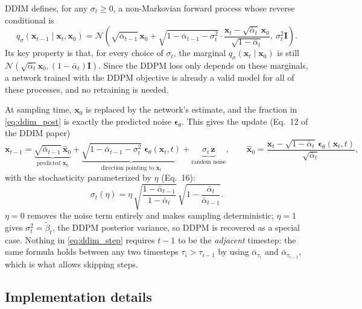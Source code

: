 \documentclass[a4paper]{article} %
\newcommand{\ab}{\bar{\alpha}}
\begin{document}
DDIM defines, for any $\sigma_t \ge 0$, a non-Markovian forward process whose reverse conditional is
\begin{equation}
    \label{eq:ddim_post}
    q_\sigma(\mathbf{x}_{t-1}\mid\mathbf{x}_t,\mathbf{x}_0) =
    \mathcal{N}\!\left(\sqrt{\ab_{t-1}}\,\mathbf{x}_0 +
    \sqrt{1-\ab_{t-1}-\sigma_t^2}\cdot\frac{\mathbf{x}_t-\sqrt{\ab_t}\,\mathbf{x}_0}{\sqrt{1-\ab_t}},\
    \sigma_t^2\mathbf{I}\right).
\end{equation}
Its key property is that, for every choice of $\sigma_t$, the marginal $q_\sigma(\mathbf{x}_t\mid\mathbf{x}_0)$
is still $\mathcal{N}(\sqrt{\ab_t}\mathbf{x}_0,(1-\ab_t)\mathbf{I})$. Since the DDPM loss only depends on
these marginals, a network trained with the DDPM objective is already a valid model for all of these
processes, and no retraining is needed.

At sampling time, $\mathbf{x}_0$ is replaced by the network's estimate, and the fraction in
\autoref{eq:ddim_post} is exactly the predicted noise $\boldsymbol{\epsilon}_\theta$. This gives
the update (Eq.\ 12 of the DDIM paper)
\begin{equation}
    \label{eq:ddim_step}
    \mathbf{x}_{t-1} =
    \underbrace{\sqrt{\ab_{t-1}}\,\hat{\mathbf{x}}_0}_{\text{predicted } \mathbf{x}_0}
    + \underbrace{\sqrt{1-\ab_{t-1}-\sigma_t^2}\;\boldsymbol{\epsilon}_\theta(\mathbf{x}_t,t)}_{\text{direction pointing to } \mathbf{x}_t}
    + \underbrace{\sigma_t\,\mathbf{z}}_{\text{random noise}},
    \qquad
    \hat{\mathbf{x}}_0 = \frac{\mathbf{x}_t-\sqrt{1-\ab_t}\,\boldsymbol{\epsilon}_\theta(\mathbf{x}_t,t)}{\sqrt{\ab_t}},
\end{equation}
with the stochasticity parameterized by $\eta$ (Eq.\ 16):
\begin{equation}
    \label{eq:sigma}
    \sigma_t(\eta) = \eta\,\sqrt{\frac{1-\ab_{t-1}}{1-\ab_t}}\,\sqrt{1-\frac{\ab_t}{\ab_{t-1}}}.
\end{equation}
$\eta=0$ removes the noise term entirely and makes sampling deterministic; $\eta=1$ gives
$\sigma_t^2 = \tilde{\beta}_t$, the DDPM posterior variance, so DDPM is recovered as a special case.
Nothing in \autoref{eq:ddim_step} requires $t-1$ to be the \emph{adjacent} timestep: the same
formula holds between any two timesteps $\tau_i > \tau_{i-1}$ by using $\ab_{\tau_i}$ and
$\ab_{\tau_{i-1}}$, which is what allows skipping steps.

\subsection{Implementation details}
\end{document}
